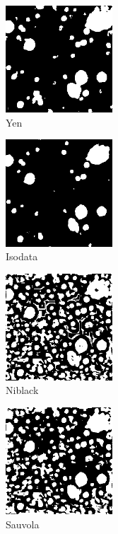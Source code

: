 \documentclass[11pt]{article}
\begin{document}
\begin{figure}[H]
	\begin{subfigure}{5cm}
		\centering
		\includegraphics[width=4cm]{files/results/yen.png}
		\caption{Yen}\hfill
	\end{subfigure}
	\begin{subfigure}{5cm}
		\centering
		\includegraphics[width=4cm]{files/results/isodata.png}
		\caption{Isodata}\hfill
	\end{subfigure}
	\begin{subfigure}{5cm}
		\centering
		\includegraphics[width=4cm]{files/results/niblack.png}
		\caption{Niblack}\hfill
	\end{subfigure}
	\begin{subfigure}{5cm}
		\centering
		\includegraphics[width=4cm]{files/results/sauvola.png}
		\caption{Sauvola}\hfill
	\end{subfigure}
	\begin{subfigure}{5cm}

\end{subfigure}
\end{figure}
\end{document}
